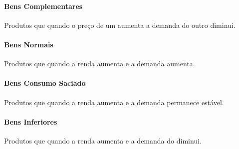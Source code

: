\documentclass{article}
\begin{document}
            \paragraph{Bens Complementares}Produtos que quando o preço de um aumenta a demanda do outro diminui.

            \paragraph{Bens Normais}Produtos que quando a renda aumenta e a demanda aumenta.

            \paragraph{Bens Consumo Saciado}Produtos que quando a renda aumenta e a demanda permanece estável.

            \paragraph{Bens Inferiores}Produtos que quando a renda aumenta e a demanda do diminui.
\end{document}
